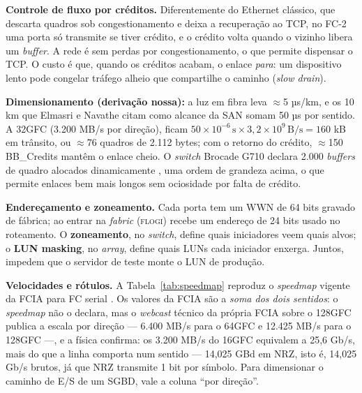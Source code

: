 \documentclass[11pt,a4paper]{article}
\begin{document}
\textbf{Controle de fluxo por créditos.} Diferentemente do Ethernet clássico, que descarta quadros sob
congestionamento e deixa a recuperação ao TCP, no FC-2 uma porta só transmite se tiver crédito, e o
crédito volta quando o vizinho libera um \textit{buffer}. A rede é sem perdas por congestionamento, o
que permite dispensar o TCP. O custo é que, quando os créditos acabam, o enlace \emph{para}: um
dispositivo lento pode congelar tráfego alheio que compartilhe o caminho (\textit{slow drain}).

\textbf{Dimensionamento (derivação nossa):} a luz em fibra leva $\approx$5 µs/km, e os 10 km que Elmasri e
Navathe citam como alcance da SAN \cite{elmasri2018} somam 50 µs por sentido. A 32GFC (3.200 MB/s por
direção), ficam $50 \times 10^{-6}\,\text{s} \times 3{,}2 \times 10^{9}\,\text{B/s} = 160$ kB em trânsito, ou
$\approx$76 quadros de 2.112 bytes; com o retorno do crédito, $\approx$150 BB\_Credits mantêm o enlace cheio. O
\textit{switch} Brocade G710 declara 2.000 \textit{buffers} de quadro alocados dinamicamente \cite{brocadeg710},
uma ordem de grandeza acima, o que permite enlaces bem mais longos sem ociosidade por falta de crédito.

\textbf{Endereçamento e zoneamento.} Cada porta tem um WWN de 64 bits gravado de fábrica; ao entrar na
\textit{fabric} (\textsc{flogi}) recebe um endereço de 24 bits usado no roteamento. O
\textbf{zoneamento}, no \textit{switch}, define quais iniciadores veem quais alvos; o \textbf{LUN
masking}, no \textit{array}, define quais LUNs cada iniciador enxerga. Juntos, impedem que o servidor de
teste monte o LUN de produção.

\textbf{Velocidades e rótulos.} A Tabela~\ref{tab:speedmap} reproduz o \textit{speedmap} vigente da
FCIA para FC serial \cite{fciaroadmap}. Os valores da FCIA são a \emph{soma dos dois sentidos}: o
\textit{speedmap} não o declara, mas o \textit{webcast} técnico da própria FCIA sobre o 128GFC publica a
escala por direção --- 6.400 MB/s para o 64GFC e 12.425 MB/s para o 128GFC \cite{fcia128webcast} ---, e
a física confirma: os 3.200 MB/s do 16GFC equivalem a 25,6 Gb/s, mais do que a linha comporta num sentido --- 14,025 GBd em NRZ, isto é, 14,025 Gb/s brutos, já que NRZ transmite 1 bit por símbolo. Para
dimensionar o caminho de E/S de um SGBD, vale a coluna ``por direção''.
\end{document}
